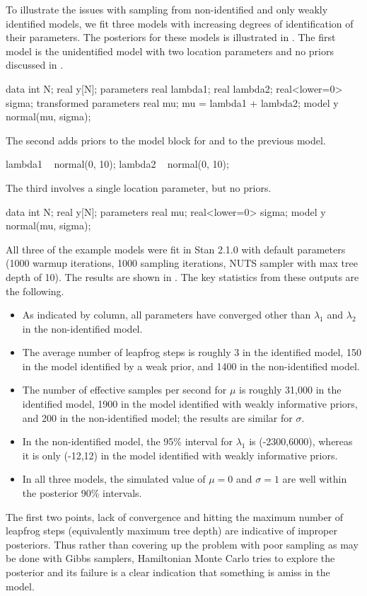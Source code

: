 To illustrate the issues with sampling from non-identified and only
weakly identified models, we fit three models with increasing degrees
of identification of their parameters.  The posteriors for these
models is illustrated in .  The
first model is the unidentified model with two location parameters and
no priors discussed in .
%
\begin{stancode}
data {
  int N;
  real y[N];
}
parameters {
  real lambda1;
  real lambda2;
  real<lower=0> sigma;
}
transformed parameters {
  real mu;
  mu = lambda1 + lambda2;
}
model {
  y ~ normal(mu, sigma);
}
\end{stancode}
%
The second adds priors to the model block for  and
 to the previous model.
%
\begin{stancode}
  lambda1 ~ normal(0, 10);
  lambda2 ~ normal(0, 10);
\end{stancode}
%
The third involves a single location parameter, but no priors.
%
\begin{stancode}
data {
  int N;
  real y[N];
}
parameters {
  real mu;
  real<lower=0> sigma;
}
model {
  y ~ normal(mu, sigma);
}
\end{stancode}
%
All three of the example models were fit in Stan 2.1.0 with default
parameters (1000 warmup iterations, 1000 sampling iterations, NUTS
sampler with max tree depth of 10). The results are shown in
. The key statistics from these
outputs are the following.
%
\begin{itemize}
\item As indicated by  column, all parameters have
  converged other than $\lambda_1$ and $\lambda_2$ in the
  non-identified model.
\item
  The average number of leapfrog steps is roughly 3 in
  the identified model, 150 in the model identified by a weak prior, and
  1400 in the non-identified model.
\item
  The number of effective samples per
  second for $\mu$ is roughly 31,000 in the identified model, 1900 in the model
  identified with weakly informative priors, and 200 in the
  non-identified model; the results are similar for $\sigma$.
\item
  In the non-identified model, the 95\% interval for $\lambda_1$ is
  (-2300,6000), whereas it is only (-12,12) in the model identified with
  weakly informative priors.
\item
  In all three models, the simulated value of $\mu=0$ and $\sigma=1$
  are well within the posterior 90\% intervals.
\end{itemize}
%
The first two points, lack of convergence and hitting the maximum
number of leapfrog steps (equivalently maximum tree depth) are
indicative of improper posteriors.  Thus rather than covering up the
problem with poor sampling as may be done with Gibbs samplers,
Hamiltonian Monte Carlo tries to explore the posterior and its failure
is a clear indication that something is amiss in the model.


